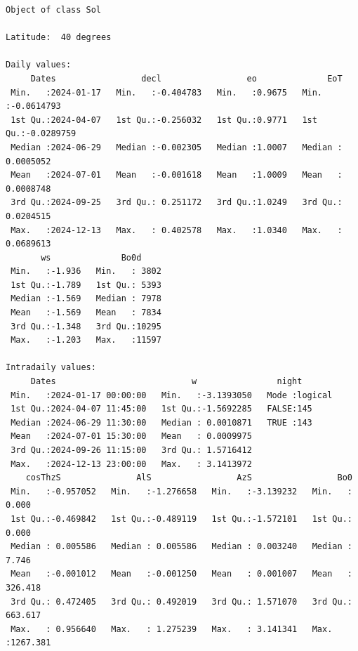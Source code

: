 \begin{verbatim}
Object of class Sol 

Latitude:  40 degrees

Daily values:
     Dates                 decl                 eo              EoT            
 Min.   :2024-01-17   Min.   :-0.404783   Min.   :0.9675   Min.   :-0.0614793  
 1st Qu.:2024-04-07   1st Qu.:-0.256032   1st Qu.:0.9771   1st Qu.:-0.0289759  
 Median :2024-06-29   Median :-0.002305   Median :1.0007   Median : 0.0005052  
 Mean   :2024-07-01   Mean   :-0.001618   Mean   :1.0009   Mean   : 0.0008748  
 3rd Qu.:2024-09-25   3rd Qu.: 0.251172   3rd Qu.:1.0249   3rd Qu.: 0.0204515  
 Max.   :2024-12-13   Max.   : 0.402578   Max.   :1.0340   Max.   : 0.0689613  
       ws              Bo0d      
 Min.   :-1.936   Min.   : 3802  
 1st Qu.:-1.789   1st Qu.: 5393  
 Median :-1.569   Median : 7978  
 Mean   :-1.569   Mean   : 7834  
 3rd Qu.:-1.348   3rd Qu.:10295  
 Max.   :-1.203   Max.   :11597  

Intradaily values: 
     Dates                           w                night        
 Min.   :2024-01-17 00:00:00   Min.   :-3.1393050   Mode :logical  
 1st Qu.:2024-04-07 11:45:00   1st Qu.:-1.5692285   FALSE:145      
 Median :2024-06-29 11:30:00   Median : 0.0010871   TRUE :143      
 Mean   :2024-07-01 15:30:00   Mean   : 0.0009975                  
 3rd Qu.:2024-09-26 11:15:00   3rd Qu.: 1.5716412                  
 Max.   :2024-12-13 23:00:00   Max.   : 3.1413972                  
    cosThzS               AlS                 AzS                 Bo0          
 Min.   :-0.957052   Min.   :-1.276658   Min.   :-3.139232   Min.   :   0.000  
 1st Qu.:-0.469842   1st Qu.:-0.489119   1st Qu.:-1.572101   1st Qu.:   0.000  
 Median : 0.005586   Median : 0.005586   Median : 0.003240   Median :   7.746  
 Mean   :-0.001012   Mean   :-0.001250   Mean   : 0.001007   Mean   : 326.418  
 3rd Qu.: 0.472405   3rd Qu.: 0.492019   3rd Qu.: 1.571070   3rd Qu.: 663.617  
 Max.   : 0.956640   Max.   : 1.275239   Max.   : 3.141341   Max.   :1267.381
\end{verbatim}

